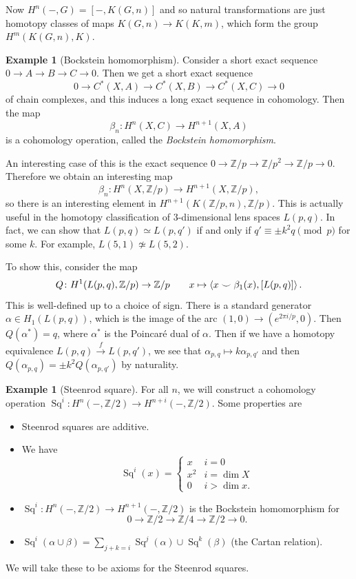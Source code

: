 \documentclass[leqno, openany]{memoir}
\theoremstyle{definition}
\newtheorem{exm}[thm]{Example}
\theoremstyle{remark}
\theoremstyle{plain}
\theoremstyle{definition}
\theoremstyle{remark}
\newcommand{\Z}{\mathbb{Z}}
\DeclareMathOperator{\Sq}{Sq}
\begin{document}
Now $H^n(-,G) = [-, K(G, n)]$ and so natural transformations are just homotopy classes of maps $K(G, n) \to K(K, m)$, which form the group $H^m(K(G, n), K)$.

\begin{exm}[Bockstein homomorphism]
    Consider a short exact sequence $0 \to A \to B \to C \to 0$. Then we get a short exact sequence
    \[ 0 \to C^*(X, A) \to C^*(X,B) \to C^*(X,C) \to 0 \]
    of chain complexes, and this induces a long exact sequence in cohomology. Then the map
    \[ \beta_n \colon H^n(X, C) \to H^{n+1}(X, A) \]
    is a cohomology operation, called the \textit{Bockstein homomorphism}.

    An interesting case of this is the exact sequence $0 \to \Z/p \to \Z/p^2 \to \Z/p \to 0$. Therefore we obtain an interesting map
    \[ \beta_n \colon H^n(X, \Z/p) \to H^{n+1}(X, \Z/p), \]
    so there is an interesting element in $H^{n+1}(K(\Z/p, n), \Z/p)$. This is actually useful in the homotopy classification of $3$-dimensional lens spaces $L(p,q)$. In fact, we can show that $L(p,q) \simeq L(p,q')$ if and only if $q' \equiv \pm k^2 q \pmod p$ for some $k$. For example, $L(5,1) \not\simeq L(5,2)$.

    To show this, consider the map 
    \[ Q \colon H^1(L(p,q), \Z/p) \to \Z/p \qquad x \mapsto \ev{x \smile \beta_1(x), [L(p,q)]}. \]
    This is well-defined up to a choice of sign. There is a standard generator $\alpha \in H_1(L(p,q))$, which is the image of the arc $(1,0) \to (e^{2\pi i/p}, 0)$. Then $Q(\alpha^*) = q$, where $\alpha^*$ is the Poincar\'e dual of $\alpha$. Then if we have a homotopy equivalence $L(p,q) \xrightarrow{f} L(p,q')$, we see that $\alpha_{p,q} \mapsto k \alpha_{p,q'}$ and then $Q(\alpha_{p,q}) = \pm k^2 Q(\alpha_{p,q'})$ by naturality.
\end{exm}

\begin{exm}[Steenrod square]
    For all $n$, we will construct a cohomology operation $\Sq^i \colon H^n(-, \Z/2) \to H^{n+i}(-, \Z/2)$. Some properties are
    \begin{itemize}
        \item Steenrod squares are additive.
        \item We have
            \[ \Sq^i(x) = \begin{cases}
                x & i = 0 \\
                x^2 & i = \dim X \\
                0 & i > \dim x.
            \end{cases} \]
        \item $\Sq^i \colon H^n(-,\Z/2) \to H^{n+1}(-,\Z/2)$ is the Bockstein homomorphism for 
            \[ 0 \to \Z/2 \to \Z/4 \to \Z/2 \to 0. \]
        \item $\Sq^i(\alpha \cup \beta) = \sum_{j+k=i} \Sq^j(\alpha) \cup \Sq^k(\beta)$ (the Cartan relation).
    \end{itemize}
    We will take these to be axioms for the Steenrod squares.
\end{exm}
\end{document}
